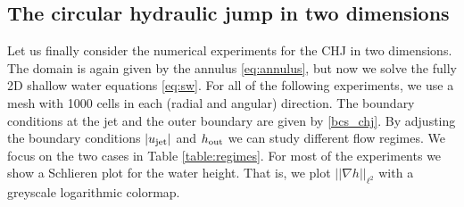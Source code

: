 \documentclass[preprint, 11pt]{article}
\newcommand{\out}{\textup{out}}
\newcommand{\jet}{{\textup{jet}}}
\newcommand{\bfu}{{u}}
\newcommand{\Fr}{{\rm Fr}}
\begin{document}
\subsection{The circular hydraulic jump in two dimensions}\label{sec:2D_chj}
Let us finally consider the numerical experiments for the CHJ in two dimensions.
The domain is again given by the annulus \eqref{eq:annulus}, but now we solve
the fully 2D shallow water equations \eqref{eq:sw}.  For all of the following
experiments, we use a mesh with 1000 cells in each (radial and angular) direction.
The boundary conditions at the jet and the outer boundary are given by \eqref{bcs_chj}.
By adjusting the boundary conditions $|\bfu_\jet|$ and $h_\out$ we can study different flow regimes.
We focus on the two cases in Table \ref{table:regimes}.
%
%
For most of the experiments we show a Schlieren plot for the water height.
That is, we plot $||\nabla h||_{\ell^2}$ with a greyscale logarithmic colormap.
\end{document}
